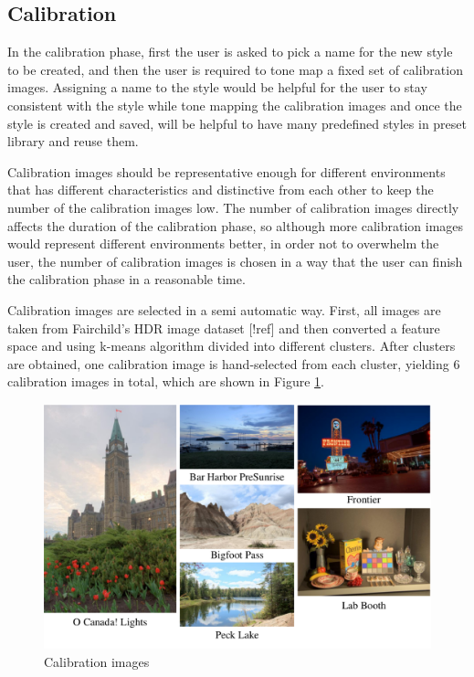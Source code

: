 \subsection{Calibration}
In the calibration phase, first the user is asked to pick a name for the new style to be created, and then the user is required to tone map a fixed set of calibration images. Assigning a name to the style would be helpful for the user to stay consistent with the style while tone mapping the calibration images and once the style is created and saved, will be helpful to have many predefined styles in preset library and reuse them. 

Calibration images should be representative enough for different environments that has different characteristics and distinctive from each other to keep the number of the calibration images low. The number of calibration images directly affects the duration of the calibration phase, so although more calibration images would represent different environments better, in order not to overwhelm the user, the number of calibration images is chosen in a way that the user can finish the calibration phase in a reasonable time.

Calibration images are selected in a semi automatic way. First, all images are taken from Fairchild's HDR image dataset [!ref] and then converted a feature space and using k-means algorithm divided into different clusters. After clusters are obtained, one calibration image is hand-selected from each cluster, yielding 6 calibration images in total, which are shown in Figure \ref{fig:calibration_images}.

\begin{figure}
\begin{center}
\includegraphics[width=\textwidth]{figures/chapter5/temp_calibration_images.png}
\caption{Calibration images
}
\label{fig:calibration_images}
\end{center}
\end{figure}

